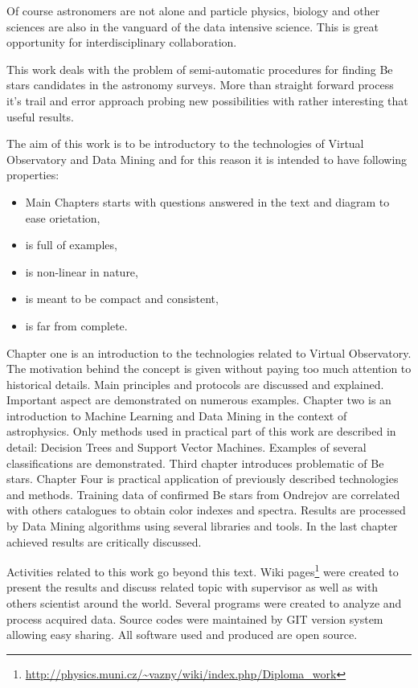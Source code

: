 Of course astronomers are not alone and particle physics, biology and
other sciences are also in the vanguard of the data intensive
science. This is great opportunity for interdisciplinary
collaboration. 

This work deals with the problem of semi-automatic procedures for
finding Be stars \cite{porter2003classical} candidates in the
astronomy surveys. More than straight forward process it's trail and
error approach probing new possibilities with rather interesting that
useful results.

The aim of this work is to be introductory to the technologies of
Virtual Observatory and Data Mining and for this reason it is intended
to have following properties:

\begin{itemize}
\item Main Chapters starts with questions answered in the text and
  diagram to ease orietation,
\item is full of examples, 
\item is non-linear in nature,
\item is meant to be compact and consistent,
\item is far from complete.
\end{itemize}

Chapter one is an introduction to the technologies related to Virtual
Observatory. The motivation behind the concept is given without paying
too much attention to historical details. Main principles and
protocols are discussed and explained. Important aspect are
demonstrated on numerous examples. Chapter two is an introduction to
Machine Learning and Data Mining in the context of astrophysics. Only
methods used in practical part of this work are described in detail:
Decision Trees and Support Vector Machines. Examples of several
classifications are demonstrated. Third chapter introduces problematic
of Be stars. Chapter Four is practical application of previously
described technologies and methods. Training data of confirmed Be
stars from Ondrejov are correlated with others catalogues to obtain
color indexes and spectra. Results are processed by Data Mining
algorithms using several libraries and tools. In the last chapter
achieved results are critically discussed.

Activities related to this work go beyond this text. Wiki
pages\footnote{\url{http://physics.muni.cz/~vazny/wiki/index.php/Diploma_work}}
were created to present the results and discuss related topic with
supervisor as well as with others scientist around the world. Several
programs were created to analyze and process acquired data. Source
codes were maintained by GIT version system allowing easy sharing. All
software used and produced are open source.








